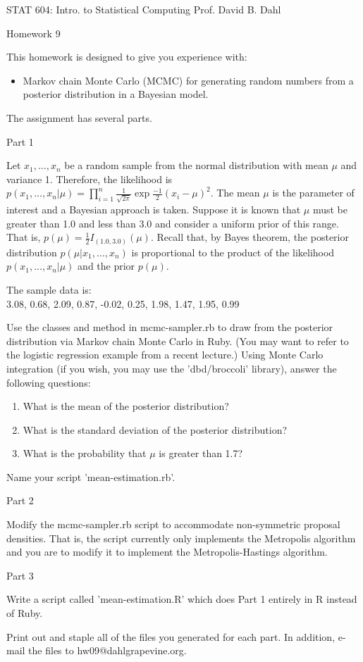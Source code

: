 \documentclass[12pt]{article}
\begin{document}
STAT 604: Intro. to Statistical Computing \hfill Prof. David B. Dahl
\begin{center}
\Large Homework 9\\
\end{center}

This homework is designed to give you experience with:
\begin{itemize}
\item Markov chain Monte Carlo (MCMC) for generating random numbers from a posterior distribution in a Bayesian model.
\end{itemize}

The assignment has several parts.

\Large Part 1

\normalsize Let $x_1,\ldots,x_n$ be a random sample from the normal distribution with mean $\mu$ and variance 1. Therefore, the likelihood is $p(x_1,\ldots,x_n|\mu) = \prod_{i=1}^n \frac{1}{\sqrt{2\pi}} \exp{\frac{-1}{2}(x_i - \mu)^2}$. The mean $\mu$ is the parameter of interest and a Bayesian approach is taken. Suppose it is known that $\mu$ must be greater than 1.0 and less than 3.0 and consider a uniform prior of this range. That is, $p(\mu) = \frac{1}{2} I_{(1.0,3.0)}(\mu)$. Recall that, by Bayes theorem, the posterior distribution $p(\mu|x_1,\ldots,x_n)$ is proportional to the product of the likelihood $p(x_1,\ldots,x_n|\mu)$ and the prior $p(\mu)$.

The sample data is:\\
3.08, 0.68, 2.09, 0.87, -0.02, 0.25, 1.98, 1.47, 1.95, 0.99

Use the classes and method in mcmc-sampler.rb to draw from the posterior distribution via Markov chain Monte Carlo in Ruby. (You may want to refer to the logistic regression example from a recent lecture.) Using Monte Carlo integration (if you wish, you may use the 'dbd/broccoli' library), answer the following questions:
\begin{enumerate}
\item What is the mean of the posterior distribution?
\item What is the standard deviation of the posterior distribution?
\item What is the probability that $\mu$ is greater than 1.7?
\end{enumerate}

Name your script 'mean-estimation.rb'.

\Large Part 2

\normalsize Modify the mcmc-sampler.rb script to accommodate non-symmetric proposal densities. That is, the script currently only implements the Metropolis algorithm and you are to modify it to implement the Metropolis-Hastings algorithm.

\Large Part 3

\normalsize Write a script called 'mean-estimation.R' which does Part 1 entirely in R instead of Ruby.

Print out and staple all of the files you generated for each part. In addition, e-mail the files to hw09@dahlgrapevine.org.
\end{document}
